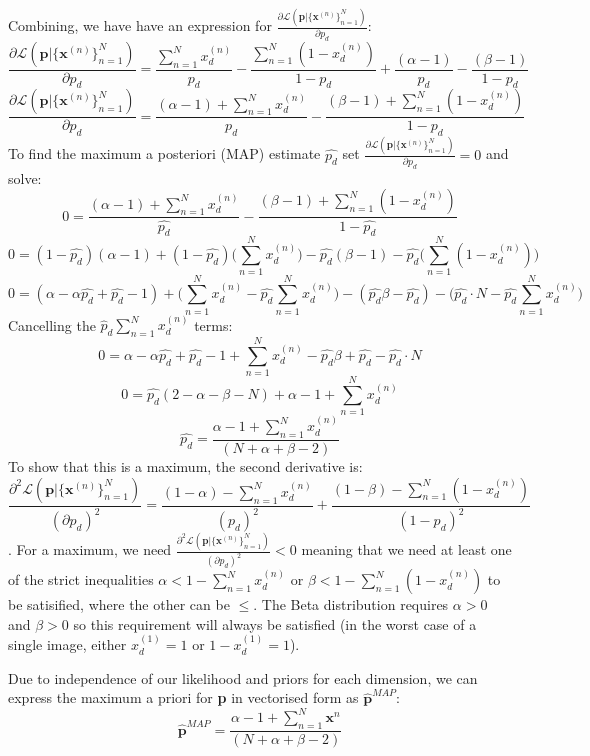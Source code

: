 \documentclass[12pt]{article}
\begin{document}
\begin{enumerate}
Combining, we have have an expression for $\frac{\partial\mathcal{L}(\textbf{p}|\{\textbf{x}^{(n)}\}_{n=1}^N)}{\partial p_d}$:
$$\frac{\partial\mathcal{L}(\textbf{p}|\{\textbf{x}^{(n)}\}_{n=1}^N)}{\partial p_d} = \frac{\sum_{n=1}^{N} x_d^{(n)}}{p_d} -  \frac{\sum_{n=1}^{N} (1-x_d^{(n)})}{1-p_d} + \frac{(\alpha-1)}{p_d} -  \frac{(\beta-1)}{1-p_d}$$
$$\frac{\partial\mathcal{L}(\textbf{p}|\{\textbf{x}^{(n)}\}_{n=1}^N)}{\partial p_d} = \frac{(\alpha-1) + \sum_{n=1}^{N} x_d^{(n)}}{p_d} -  \frac{(\beta-1) + \sum_{n=1}^{N} (1-x_d^{(n)})}{1-p_d}$$
To find the maximum a posteriori (MAP) estimate $\hat{p_d}$ set $\frac{\partial\mathcal{L}(\textbf{p}|\{\textbf{x}^{(n)}\}_{n=1}^N)}{\partial p_d} = 0$ and solve:
$$0 = \frac{(\alpha-1) + \sum_{n=1}^{N} x_d^{(n)}}{\hat{p_d}} -  \frac{(\beta-1) + \sum_{n=1}^{N} (1-x_d^{(n)})}{1-\hat{p_d}}$$
$$0 = (1-\hat{p_d})(\alpha-1) + (1-\hat{p_d})\bigg(\sum_{n=1}^{N} x_d^{(n)}\bigg) -  \hat{p_d}(\beta-1) - \hat{p_d}\bigg(\sum_{n=1}^{N} (1-x_d^{(n)})\bigg)$$
$$0 = (\alpha-\alpha \hat{p_d} + \hat{p_d} - 1) +\bigg(\sum_{n=1}^{N} x_d^{(n)} - \hat{p_d} \sum_{n=1}^{N} x_d^{(n)}\bigg) -  (\hat{p_d}\beta-\hat {p_d}) - \bigg(\hat{p_d}\cdot N - \hat{p_d}\sum_{n=1}^{N}x_d^{(n)}\bigg)$$
Cancelling the $\hat p_d\sum_{n=1}^{N} x_d^{(n)}$ terms:
$$0 = \alpha-\alpha \hat{p_d} + \hat{p_d} - 1 +\sum_{n=1}^{N} x_d^{(n)} -  \hat{p_d}\beta+\hat{p_d} - \hat{p_d}\cdot N$$
$$0 = \hat{p_d}(2-\alpha-\beta-N) + \alpha - 1 +\sum_{n=1}^{N} x_d^{(n)}$$
$$\hat{p_d} =  \frac{\alpha - 1 +\sum_{n=1}^{N} x_d^{(n)}}{(N+\alpha+\beta-2)}$$
To show that this is a maximum, the second derivative is:
$$\frac{\partial^2\mathcal{L}(\textbf{p}|\{\textbf{x}^{(n)}\}_{n=1}^N)}{(\partial p_d)^2} = \frac{(1-\alpha) - \sum_{n=1}^{N} x_d^{(n)}}{(p_d)^2} +  \frac{(1-\beta) - \sum_{n=1}^{N} (1-x_d^{(n)})}{(1-p_d)^2}$$.
For a maximum, we need $\frac{\partial^2\mathcal{L}(\textbf{p}|\{\textbf{x}^{(n)}\}_{n=1}^N)}{(\partial p_d)^2} < 0$ meaning that we need at least one of the strict inequalities $\alpha < 1- \sum_{n=1}^{N} x_d^{(n)}$ or $\beta < 1-\sum_{n=1}^{N} (1-x_d^{(n)})$ to be satisified, where the other can be $\leq$. The Beta distribution requires $\alpha > 0$ and $\beta > 0$ so this requirement will always be satisfied (in the worst case of a single image, either $x_d^{(1)}=1$ or $1-x_d^{(1)}=1$).

Due to independence of our likelihood and priors for each dimension, we can express the maximum a priori for \textbf{p} in vectorised form as $\hat{\textbf{p}}^{MAP}$:
$$\hat{\textbf{p}}^{MAP} =   \frac{\alpha - 1 +\sum_{n=1}^{N} \textbf{x}^n}{(N+\alpha+\beta-2)}$$



\end{enumerate}
\end{document}
